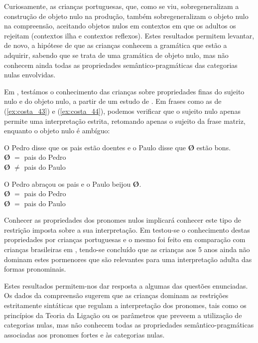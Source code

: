 \documentclass[output=paper]{LSP/langsci}
\begin{document}
Curiosamente, as crianças portuguesas, que, como se viu, sobregeneralizam a construção de objeto nulo na produção, também sobregeneralizam o objeto nulo na compreensão, aceitando objetos nulos em contextos em que os adultos os rejeitam (contextos ilha e contextos reflexos). Estes resultados permitem levantar, de novo, a hipótese de que as crianças conhecem a gramática que estão a adquirir, sabendo que se trata de uma gramática de objeto nulo, mas não conhecem ainda todas as propriedades semântico-pragmáticas das categorias nulas envolvidas.

Em \citet{costalobo2010}, testámos o conhecimento das crianças sobre propriedades finas do sujeito nulo e do objeto nulo, a partir de um estudo de \citet{miyagawa2010}. Em frases como as de (\ref{ex:costa_43}) e (\ref{ex:costa_44}), podemos verificar que o sujeito nulo apenas permite uma interpretação estrita, retomando apenas o sujeito da frase matriz, enquanto o objeto nulo é ambíguo:

\ea\label{ex:costa_43} O Pedro disse que os pais estão doentes e o Paulo disse que \textbf{Ø} estão bons.\\\textbf{Ø} $=$ pais do Pedro\\\textbf{Ø} $\neq$ pais do Paulo
\z

\ea\label{ex:costa_44} O Pedro abraçou os pais e o Paulo beijou \textbf{Ø}.\\\textbf{Ø} $=$ pais do Pedro\\\textbf{Ø} $=$ pais do Paulo
\z

Conhecer as propriedades dos pronomes nulos implicará conhecer este tipo de restrição imposta sobre a sua interpretação. Em \citet{costalobo2010} testou-se o conhecimento destas propriedades por crianças portuguesas e o mesmo foi feito em comparação com crianças brasileiras em \citet{costagrolla_etal2015}, tendo-se concluído que as crianças aos 5 anos ainda não dominam estes pormenores que são relevantes para uma interpretação adulta das formas pronominais. 

Estes resultados permitem-nos dar resposta a algumas das questões enunciadas. Os dados da compreensão sugerem que as crianças dominam as restrições estritamente sintáticas que regulam a interpretação dos pronomes, tais como os princípios da Teoria da Ligação ou os parâmetros que preveem a utilização de categorias nulas, mas não conhecem todas as propriedades semântico-pragmáticas associadas aos pronomes fortes e às categorias nulas.
\end{document}
